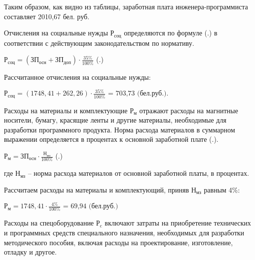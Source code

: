 {	\par \redline Таким образом, как видно из таблицы, заработная плата инженера-программиста составляет 2010,67 бел. руб.

	\par \redline  Отчисления на социальные нужды $\textrm{Р}_{\textrm{соц}}$ определяются по формуле (\thechaptercntr .\theformulacntr) в соответствии с действующим законодательством по нормативу.

	\formulaspace \par \redline 
		$\textrm{Р}_{\textrm{соц}} = (\textrm{ЗП}_{\textrm{осн}} + \textrm{ЗП}_{\textrm{доп}}) \cdot \frac{35\%}{\textrm{100\%}}$
	\hfill (\thechaptercntr .\theformulacntr) \redline
	\formulaspace \addtocounter{formulacntr}{1}

	\par \redline Рассчитанное отчисления на социальные нужды:

	\formulaspace \par \redline 
		$\textrm{Р}_{\textrm{соц}} = (1748,41 + 262,26) \cdot \frac{35\%}{\textrm{100\%}} \textrm{ = 703,73 (бел.руб.).}$
	\formulaspace 

	\par \redline Расходы на материалы и комплектующие $\textrm{Р}_{\textrm{м}}$ отражают расходы на магнитные носители, бумагу, красящие ленты и другие материалы, необходимые для разработки программного продукта. Норма расхода материалов в суммарном выражении определяется в процентах к основной заработной плате (\thechaptercntr .\theformulacntr).

	\formulaspace \par \redline 
		$\textrm{Р}_{\textrm{м}} = \textrm{ЗП}_{\textrm{осн}} \cdot \frac{\textrm{Н}_{\textrm{мз}}}{\textrm{100\%}}$
	\hfill (\thechaptercntr .\theformulacntr) \redline
	\formulaspace \addtocounter{formulacntr}{1}

	\par \redline где $\textrm{Н}_{\textrm{мз}}$ {--} норма расхода материалов от основной заработной платы, в процентах.

	\par \redline Рассчитаем расходы на материалы и комплектующий, приняв $\textrm{Н}_{\textrm{мз}}$ равным 4\%:

	\formulaspace \par \redline 
		$\textrm{Р}_{\textrm{м}} = 1748,41 \cdot \frac{\textrm{4\%}}{\textrm{100\%}} \textrm{ = 69,94 (бел.руб.)}$ 
	\formulaspace 

	\par \redline Расходы на спецоборудование $\textrm{Р}_{\textrm{c}}$ включают затраты на приобретение технических и программных средств специального назначения, необходимых для разработки методического пособия, включая расходы на проектирование, изготовление, отладку и другое.
	
}
